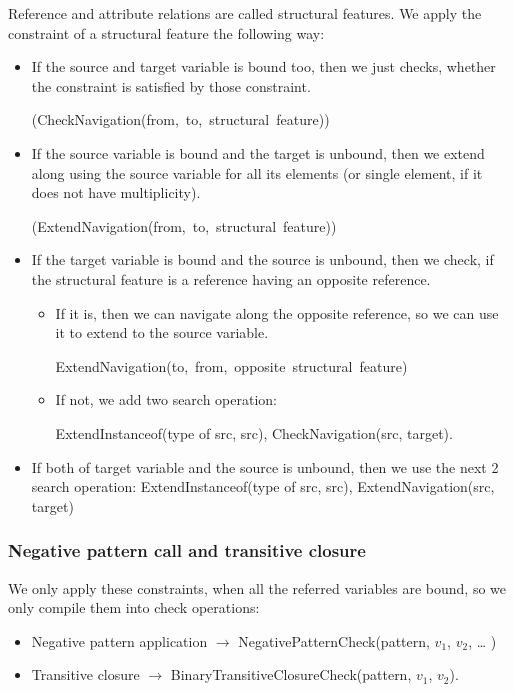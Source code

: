 Reference and attribute relations are called structural features.
We apply the constraint of a structural feature the following way:
\begin{itemize}
	\item If the source and target variable is bound too, then we just checks, whether the constraint is satisfied by those constraint. 
	
	\mbox{(CheckNavigation(from, to, structural feature))}
	\item If the source variable is bound and the target is unbound, then we extend along using the source variable for all its elements (or single element, if it does not have multiplicity). 
	
	\mbox{(ExtendNavigation(from, to, structural feature))}
	\item If the target variable is bound and the source is unbound, then we check, if the structural feature is a reference having an opposite reference. 
	\begin{itemize}
		\item If it is, then we can navigate along the opposite reference, so we can use it to extend to the source variable. 
		
		\mbox{ExtendNavigation(to, from, opposite structural feature)}
		\item If not, we add two search operation: 
		
		ExtendInstanceof(type of src, src), CheckNavigation(src, target). 
	\end{itemize}

	\item If both of  target variable and the source is unbound, then we use the next 2 search operation: ExtendInstanceof(type of src, src), ExtendNavigation(src, target)

\end{itemize}


\subsubsection{Negative pattern call and transitive closure}

We only apply these constraints, when all the referred variables are bound, so we only compile them into check operations:
\begin{itemize}
	\item Negative pattern application $\rightarrow{}$ NegativePatternCheck(pattern, $v_1$, $v_2$, \dots{} )
	\item Transitive closure $\rightarrow{}$ BinaryTransitiveClosureCheck(pattern, $v_1$, $v_2$).
\end{itemize}

